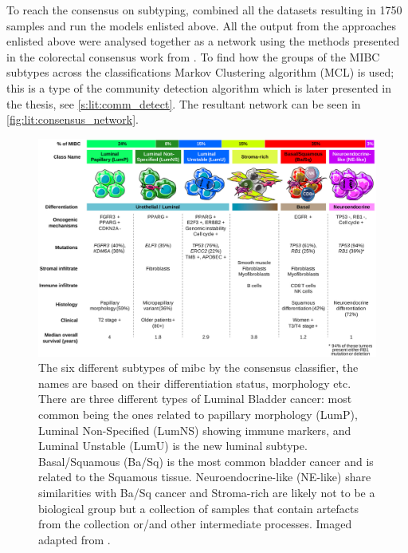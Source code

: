 To reach the consensus on subtyping, \citet{Kamoun2020-tj} combined all the datasets resulting in 1750 samples and run the models enlisted above. All the output from the approaches enlisted above were analysed together as a network using the methods presented in the colorectal consensus work from \citet{Guinney2015-fy}. To find how the groups of the MIBC subtypes across the classifications Markov Clustering algorithm (MCL) \citet{Van_Dongen2008-yj} is used; this is a type of the community detection algorithm which is later presented in the thesis, see \cref{s:lit:comm_detect}. The resultant network can be seen in \cref{fig:lit:consensus_network}.

\begin{figure}[!t]   
\centering
\includegraphics[width=1.0\textwidth,height=1.0\textheight,keepaspectratio]{Sections/Lit_review/Resources/2020_consensus_subtypes.jpg}
  \caption{The six different subtypes of \acrfull{mibc} by the consensus classifier\cite{Kamoun2020-tj}, the names are based on their differentiation status, morphology etc. There are three different types of Luminal Bladder cancer: most common being the ones related to papillary morphology (LumP), Luminal Non-Specified (LumNS) showing immune markers, and Luminal Unstable (LumU) is the new luminal subtype. Basal/Squamous (Ba/Sq) is the most common bladder cancer and is related to the Squamous tissue. Neuroendocrine-like (NE-like) share similarities with Ba/Sq cancer and Stroma-rich are likely not to be a biological group but a collection of samples that contain artefacts from the collection or/and other intermediate processes. Imaged adapted from \cite{Kamoun2020-tj}.
}
\label{fig:lit:2020_consens}
\end{figure}
\FloatBarrier


